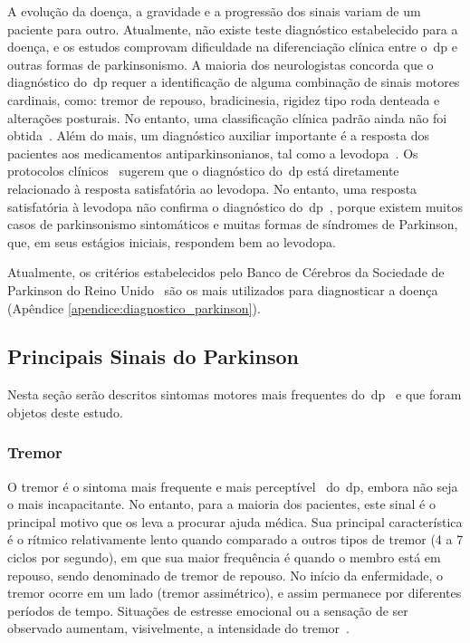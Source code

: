 A evolução da doença, a gravidade e a progressão dos sinais variam de um paciente para outro. Atualmente, não existe teste diagnóstico estabelecido para a doença, e os estudos comprovam dificuldade na diferenciação clínica entre o~\ac{dp} e outras formas de parkinsonismo. A maioria dos neurologistas concorda que o diagnóstico do~\ac{dp} requer a identificação de alguma combinação de sinais motores cardinais, como: tremor de repouso, bradicinesia, rigidez tipo roda denteada e alterações posturais. No entanto, uma classificação clínica padrão ainda não foi obtida~\cite{protpar010}. Além do mais, um diagnóstico auxiliar importante é a resposta dos pacientes aos medicamentos antiparkinsonianos, tal como a levodopa~\cite{protpar010}. Os protocolos clínicos~\cite{protpar010,national2006parkinson} sugerem que o diagnóstico do~\ac{dp} está diretamente relacionado à resposta satisfatória ao levodopa. No entanto, uma resposta satisfatória à levodopa não confirma o diagnóstico do~\ac{dp}~\cite{rowlandtratado}, porque 
existem muitos casos de parkinsonismo sintomáticos e muitas formas de síndromes de Parkinson, que, em seus estágios iniciais, respondem bem ao levodopa. 

Atualmente, os critérios estabelecidos pelo Banco de Cérebros da Sociedade de Parkinson do Reino Unido~\cite{national2006parkinson} são os mais utilizados para diagnosticar a doença (Apêndice \ref{apendice:diagnostico_parkinson}). 


\subsection{Principais Sinais do Parkinson}
Nesta seção serão descritos sintomas motores mais frequentes do~\ac{dp}~\cite{protpar010} e que foram objetos deste estudo.

\subsubsection{Tremor}\label{sec:tremor}
O tremor é o sintoma mais frequente e mais perceptível~\cite{limongi2002} do~\ac{dp}, embora não seja o mais incapacitante. No entanto, para a maioria dos pacientes, este sinal é o principal motivo que os leva a procurar ajuda médica. Sua principal característica é o rítmico relativamente lento quando comparado a outros tipos de tremor (4 a 7 ciclos por segundo), em que sua maior frequência é quando o membro está em repouso, sendo denominado de tremor de repouso. No início da enfermidade, o tremor ocorre em um lado (tremor assimétrico), e assim permanece por diferentes períodos de tempo. Situações de estresse emocional ou a sensação de ser observado aumentam, visivelmente, a intensidade do tremor~\cite{jankovic2008}. 


